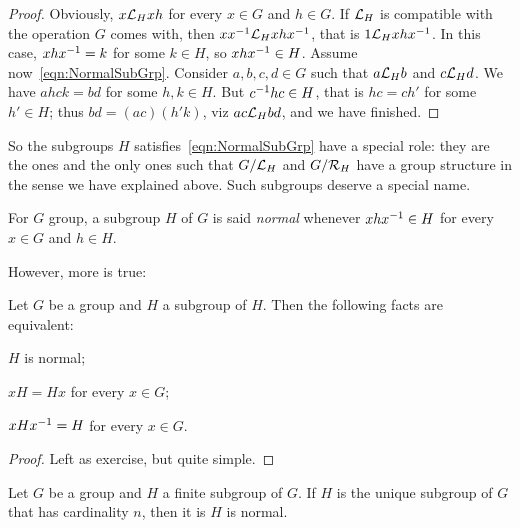 \begin{proof}
Obviously, \(x \mathcal L_H xh\) for every \(x \in G\) and \(h \in G\). If \(\mathcal L_H\) is compatible with the operation \(G\) comes with, then \(x x^{-1} \mathcal L_H x h x^{-1}\), that is \(1 \mathcal L_H x h x^{-1}\). In this case, \(x h x^{-1} = k\) for some \(k \in H\), so \(xhx^{-1} \in H\).\newline
Assume now~\eqref{eqn:NormalSubGrp}. Consider \(a, b, c, d \in G\) such that \(a \mathcal L_H b\) and \(c \mathcal L_H d\). We have \(ahck=bd\) for some \(h, k \in H\). But \(c^{-1}hc \in H\), that is \(hc = c h'\) for some \(h' \in H\); thus \(bd = (ac)(h'k)\), viz \(ac \mathcal L_H bd\), and we have finished.
\end{proof}

So the subgroups \(H\) satisfies~\eqref{eqn:NormalSubGrp} have a special role: they are the ones and the only ones such that \(G/\mathcal L_H\) and \(G/\mathcal R_H\) have a group structure in the sense we have explained above. Such subgroups deserve a special name.

\begin{definition}
For \(G\) group, a subgroup \(H\) of \(G\) is said {\em normal} whenever \(xhx^{-1} \in H\) for every \(x \in G\) and \(h \in H\).
\end{definition}

However, more is true:

\begin{proposition}
Let \(G\) be a group and \(H\) a subgroup of \(H\). Then the following facts are equivalent:
\begin{tcbenum}
\item \(H\) is normal;
\item \(xH = Hx\) for every \(x \in G\);
\item \(xHx^{-1} = H\) for every \(x \in G\).
\end{tcbenum}
\end{proposition}

\begin{proof}
Left as exercise, but quite simple.
\end{proof}

\begin{corollary}
Let \(G\) be a group and \(H\) a finite subgroup of \(G\). If \(H\) is the unique subgroup of \(G\) that has cardinality \(n\), then it is \(H\) is normal.
\end{corollary}

